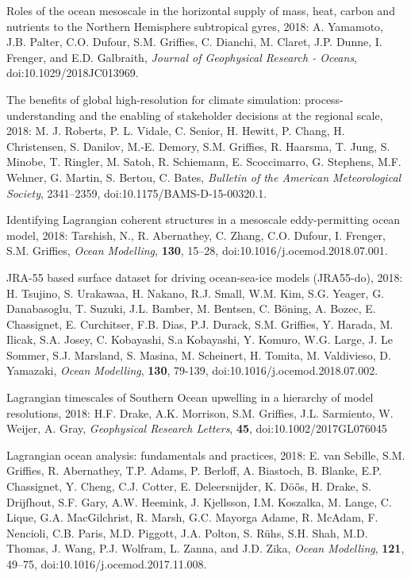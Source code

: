 \begin{etaremune}
\item Roles of the ocean mesoscale in the horizontal supply of mass, heat, carbon and nutrients to the Northern Hemisphere subtropical gyres, 2018: A. Yamamoto, J.B. Palter, C.O. Dufour, S.M. Grif\/f\/ies, C. Dianchi, M. Claret, J.P. Dunne, I. Frenger, and E.D. Galbraith, {\it Journal of Geophysical Research - Oceans},  doi:10.1029/2018JC013969.

\item The benefits of global high-resolution for climate simulation: process-understanding and the enabling of stakeholder decisions at the regional scale, 2018: M. J. Roberts, P. L. Vidale, C. Senior, H. Hewitt, P. Chang, H. Christensen, S. Danilov, M.-E. Demory, S.M. Grif\/f\/ies, R. Haarsma, T. Jung, S. Minobe, T. Ringler, M. Satoh, R. Schiemann, E. Scoccimarro, G. Stephens, M.F. Wehner, G. Martin, S. Bertou, C. Bates, {\it Bulletin of the American Meteorological Society}, 2341--2359, doi:10.1175/BAMS-D-15-00320.1. 



\item Identifying Lagrangian coherent structures in a mesoscale eddy-permitting ocean model, 2018: Tarshish, N., R. Abernathey, C. Zhang, C.O. Dufour, I. Frenger, S.M. Grif\/f\/ies, \textit{Ocean Modelling}, {\bf 130}, 15--28, doi:10.1016/j.ocemod.2018.07.001.

\item JRA-55 based surface dataset for driving ocean-sea-ice models (JRA55-do), 2018: H. Tsujino, S. Urakawaa, H. Nakano, R.J. Small, W.M. Kim, S.G. Yeager, G. Danabasoglu, T. Suzuki, J.L. Bamber, M. Bentsen, C. {B\"{o}ning}, A. Bozec, E. Chassignet, E. Curchitser, F.B. Dias, P.J. Durack, S.M. Grif\/f\/ies, Y. Harada, M. Ilicak, S.A. Josey, C. Kobayashi, S.a Kobayashi, Y. Komuro, W.G. Large, J. {Le Sommer}, S.J. Marsland, S. Masina, M. Scheinert, H. Tomita, M. Valdivieso, D. Yamazaki, {\it Ocean Modelling},  {\bf 130}, 79-139, doi:10.1016/j.ocemod.2018.07.002.

\item Lagrangian timescales of Southern Ocean upwelling in a hierarchy of model resolutions, 2018: H.F. Drake, A.K. Morrison, S.M. Grif\/f\/ies, J.L. Sarmiento, W. Weijer, A. Gray, {\it  Geophysical Research Letters}, {\bf 45}, doi:10.1002/2017GL076045

\item  Lagrangian ocean analysis: fundamentals and practices, 2018: E. van Sebille, S.M. Grif\/f\/ies, R. Abernathey, T.P. Adams, P. Berloff, A. Biastoch, B. Blanke, E.P. Chassignet, Y. Cheng, C.J. Cotter, E. Deleersnijder, K. {D\"{o}\"{o}̈s}, H. Drake, S. Drijfhout, S.F. Gary, A.W. Heemink, J. Kjellsson, I.M. Koszalka, M. Lange, C. Lique, G.A.  MacGilchrist, R. Marsh, G.C. Mayorga Adame, R. McAdam, F. Nencioli, C.B. Paris, M.D. Piggott, J.A. Polton, S. {R\"{u}hs}, S.H. Shah, M.D. Thomas, J. Wang, P.J. Wolfram, L. Zanna, and J.D. Zika, {\it Ocean Modelling},
{\bf 121}, 49--75,  doi:10.1016/j.ocemod.2017.11.008.


\end{etaremune}
